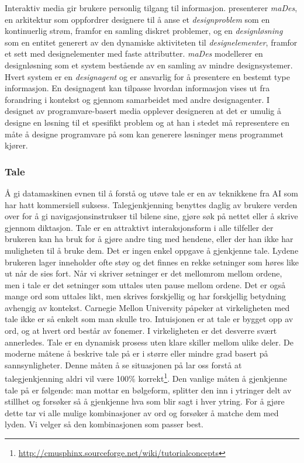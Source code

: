 Interaktiv media gir brukere personlig tilgang til informasjon. \citet{ishizaki96} presenterer \emph{maDes}, en arkitektur som oppfordrer designere til å anse et \emph{designproblem} som en kontinuerlig strøm, framfor en samling diskret problemer, og en \emph{designløsning} som en entitet generert av den dynamiske aktiviteten til \emph{designelementer}, framfor et sett med designelementer med faste attributter. \emph{maDes} modellerer en designløsning som et system bestående av en samling av mindre designsystemer. Hvert system er en \emph{designagent} og er ansvarlig for å presentere en bestemt type informasjon. En designagent kan tilpasse hvordan informasjon vises ut fra forandring i kontekst og gjennom samarbeidet med andre designagenter. I designet av programvare-basert media opplever designeren at det er umulig å designe en løsning til et spesifikt problem og at han i stedet må representere en måte å designe programvare på som kan generere løsninger mens programmet kjører.\\ 

\subsubsection*{Tale}
\label{ch:tale}
Å gi datamaskinen evnen til å forstå og utøve tale er en av teknikkene fra AI som har hatt kommersiell suksess. Talegjenkjenning benyttes daglig av brukere verden over for å gi navigasjonsinstrukser til bilene sine, gjøre søk på nettet eller å skrive gjennom diktasjon. Tale er en attraktivt interaksjonsform i alle tilfeller der brukeren kan ha bruk for å gjøre andre ting med hendene, eller der han ikke har muligheten til å bruke dem. Det er ingen enkel oppgave å gjenkjenne tale. Lydene brukeren lager inneholder ofte støy og det finnes en rekke setninger som høres like ut når de sies fort. Når vi skriver setninger er det mellomrom mellom ordene, men i tale er det setninger som uttales uten pause mellom ordene. Det er også mange ord som uttales likt, men skrives forskjellig og har forskjellig betydning avhengig av kontekst. Carnegie Mellon University påpeker at virkeligheten med tale ikke er så enkelt som man skulle tro. Intuisjonen er at tale er bygget opp av ord, og at hvert ord består av fonemer. I virkeligheten er det desverre svært annerledes. Tale er en dynamisk prosess uten klare skiller mellom ulike deler. De moderne måtene å beskrive tale på er i større eller mindre grad basert på sannsynligheter. Denne måten å se situasjonen på lar oss forstå at talegjenkjenning aldri vil være 100\% korrekt\footnote{\url{http://cmusphinx.sourceforge.net/wiki/tutorialconcepts}}. Den vanlige måten å gjenkjenne tale på er følgende: man mottar en bølgeform, splitter den inn i ytringer delt av stillhet og forsøker så å gjenkjenne hva som blir sagt i hver ytring. For å gjøre dette tar vi alle mulige kombinasjoner av ord og forsøker å matche dem med lyden. Vi velger så den kombinasjonen som passer best.

